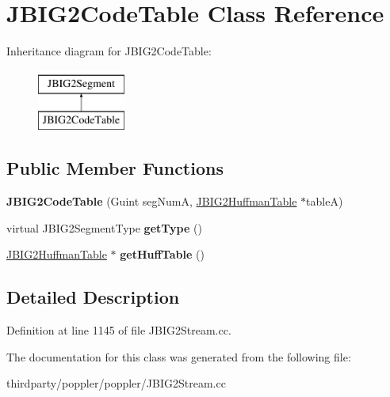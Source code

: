 \hypertarget{class_j_b_i_g2_code_table}{}\section{J\+B\+I\+G2\+Code\+Table Class Reference}
\label{class_j_b_i_g2_code_table}
Inheritance diagram for J\+B\+I\+G2\+Code\+Table\+:\begin{figure}[H]
\begin{center}
\leavevmode
\includegraphics[height=2.000000cm]{class_j_b_i_g2_code_table}
\end{center}
\end{figure}
\subsection*{Public Member Functions}
\begin{DoxyCompactItemize}
\item 
\mbox{\label{class_j_b_i_g2_code_table_ab83be52bb81c91b98f8714ff3afe284d}} 
{\bfseries J\+B\+I\+G2\+Code\+Table} (Guint seg\+NumA, \hyperlink{struct_j_b_i_g2_huffman_table}{J\+B\+I\+G2\+Huffman\+Table} $\ast$tableA)
\item 
\mbox{\label{class_j_b_i_g2_code_table_a00e918bd65af08d0cf6a41478cd9e4f3}} 
virtual J\+B\+I\+G2\+Segment\+Type {\bfseries get\+Type} ()
\item 
\mbox{\label{class_j_b_i_g2_code_table_ae6beff6a129b8f3a8b9dc42e45fed140}} 
\hyperlink{struct_j_b_i_g2_huffman_table}{J\+B\+I\+G2\+Huffman\+Table} $\ast$ {\bfseries get\+Huff\+Table} ()
\end{DoxyCompactItemize}


\subsection{Detailed Description}


Definition at line 1145 of file J\+B\+I\+G2\+Stream.\+cc.



The documentation for this class was generated from the following file\+:\begin{DoxyCompactItemize}
\item 
thirdparty/poppler/poppler/J\+B\+I\+G2\+Stream.\+cc\end{DoxyCompactItemize}
